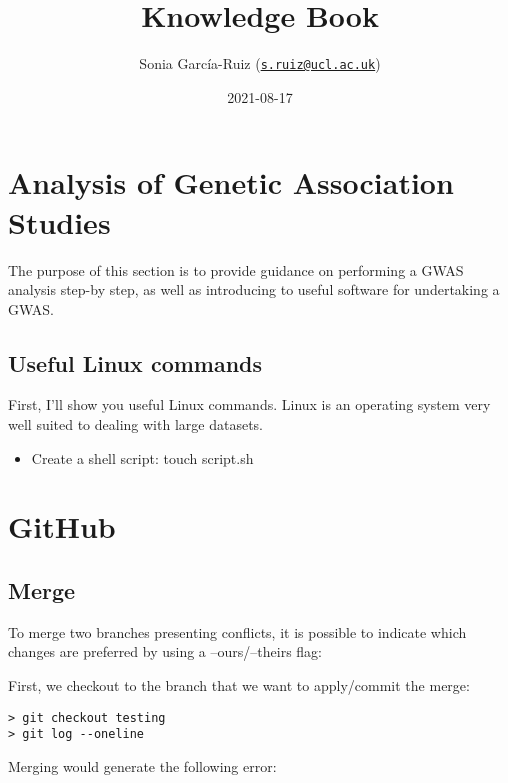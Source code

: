 \documentclass[]{book}
\title{Knowledge Book}
\author{Sonia García-Ruiz
(\href{mailto:s.ruiz@ucl.ac.uk}{\nolinkurl{s.ruiz@ucl.ac.uk}})}
\date{2021-08-17}
\providecommand{\tightlist}{%
  \setlength{\itemsep}{0pt}\setlength{\parskip}{0pt}}
\begin{document}
\maketitle

{
\setcounter{tocdepth}{1}
\tableofcontents
}
\chapter{Analysis of Genetic Association
Studies}\label{analysis-of-genetic-association-studies}

The purpose of this section is to provide guidance on performing a GWAS
analysis step-by step, as well as introducing to useful software for
undertaking a GWAS.

\section{Useful Linux commands}\label{useful-linux-commands}

First, I'll show you useful Linux commands. Linux is an operating system
very well suited to dealing with large datasets.

\begin{itemize}
\tightlist
\item
  Create a shell script: touch script.sh
\end{itemize}

\chapter{GitHub}\label{github}

\section{Merge}\label{merge}

To merge two branches presenting conflicts, it is possible to indicate
which changes are preferred by using a --ours/--theirs flag:

First, we checkout to the branch that we want to apply/commit the merge:

\begin{verbatim}
> git checkout testing
> git log --oneline
\end{verbatim}

Merging would generate the following error:
\end{document}
